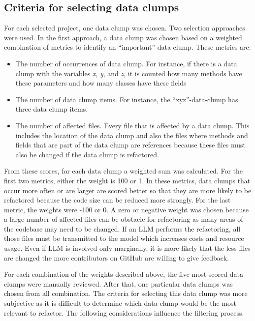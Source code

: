 \subsection{Criteria for selecting data clumps}

For each selected project, one data clump was chosen. Two selection approaches were used. 
In the first approach, a data clump was chosen based on a weighted combination of metrics to identify an \enquote{important} data clump. These metrics are:

\begin{itemize}
    \item The number of occurrences of data clump. For instance, if there is a data clump with the variables \textit{x}, \textit{y}, and  \textit{z}, it is counted how many methods have these parameters and how many classes have these fields

     \item The number of data clump items. For instance, the \enquote{xyz}-data-clump has three data clump items.
     
    \item The number of affected files. Every file that is affected by a data clump. This includes the location of the data clump and also the files where methods and fields that are part of the data clump are references because these files must also be changed if the data clump is refactored. 
    
\end{itemize}

From these scores, for each data clump a weighted sum was calculated. For the first two metrics, either the weight is 100 or 1. In these metrics, data clumps that occur more often or are larger are scored better so that they are more likely to be refactored because the code size can be reduced more strongly.  For the last metric, the weights were -100 or 0. A zero or negative weight was chosen because a large number of affected files can be obstacle for  refactoring as many areas of the codebase may need to be changed. If an \ac{LLM} performs the refactoring, all those files must be transmitted to the model which increases costs and resource usage. Even if \ac{LLM} is involved only marginally, it is more likely that the less files are changed the more contributors on GitHub are willing to give feedback.

For each combination of the weights described above, the five most-scored data clumps were manually reviewed. After that, one particular data clumps was  chosen from all combination. The criteria for selecting this data clump was more subjective as it is difficult to determine which data clump would be  the most relevant to refactor. The following considerations influence the filtering process.

